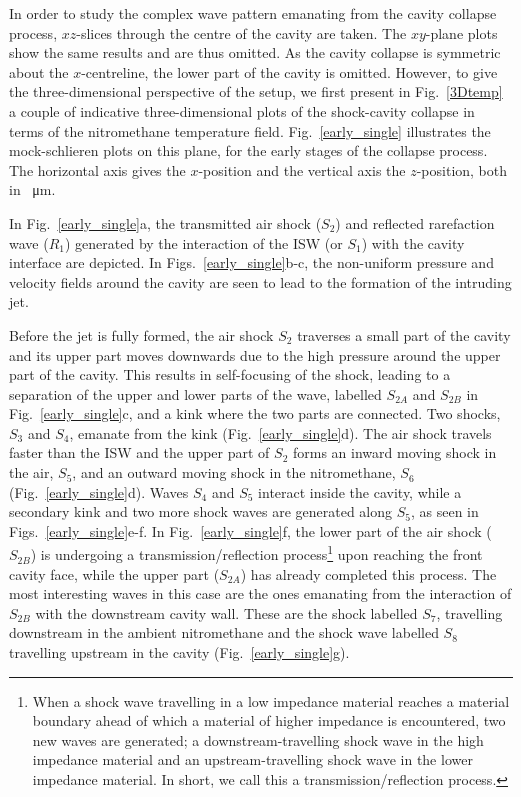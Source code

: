 \documentclass[3p,times,twocolumn]{elsarticle}
\begin{document}
In order to study the complex wave pattern emanating from the cavity collapse
process, $xz$-slices through the centre of the cavity are taken. The $xy$-plane plots show the same results and are thus omitted. As the cavity collapse is symmetric about the $x$-centreline, the lower part of the cavity is omitted. However, to give the three-dimensional perspective of the setup, we first present in Fig.\ \ref{3Dtemp} a couple of indicative three-dimensional plots of the shock-cavity collapse in terms of the nitromethane temperature field.
Fig.\  \ref{early_single} illustrates the mock-schlieren plots on this plane, for the early stages of the collapse process.
The horizontal axis gives the $x$-position  and the vertical axis the $z$-position,
both in \SI{}{\micro \meter}.
 
In Fig.\  \ref{early_single}a, the transmitted air shock ($S_2$) and reflected
rarefaction wave ($R_1$) generated by the interaction of the ISW (or $S_1$) with the
cavity interface are depicted. In Figs.\ \ref{early_single}b-c, the
non-uniform pressure and velocity fields around the cavity are seen to lead
to the formation of the intruding jet.

Before the jet is fully formed, the air shock $S_2$ traverses a small part 
of the cavity and its upper part moves downwards due to the high pressure
around the upper part of the cavity.  This results in self-focusing of the
shock, leading to a separation of the upper and lower parts of the wave,
labelled $S_{2A}$ and $S_{2B}$  in Fig.\  \ref{early_single}c, and a kink
where the two parts are connected. Two shocks,  $S_3$ and $S_4$,  emanate
from the kink (Fig.\  \ref{early_single}d). The air shock travels faster
than the ISW and the upper part of $S_2$ forms an inward moving shock in
the air, $S_5$, and an outward moving shock in the nitromethane, $S_6$ (Fig.\
 \ref{early_single}d).  Waves $S_4$ and $S_5$ interact inside the cavity,
while a secondary kink and two more shock waves are generated along $S_5$,
as seen in Figs.\  \ref{early_single}e-f. In Fig.\ \ref{early_single}f, the lower part of the air shock ($S_{2B}$) is undergoing a transmission/reflection process\footnote{When a shock wave travelling in a low impedance material reaches a material boundary ahead of which a material of higher impedance is encountered, two new waves are generated; a downstream-travelling shock wave in the high impedance material and an upstream-travelling shock wave in the lower impedance material. In short, we call this a transmission/reflection process.} upon reaching the front cavity face, while the upper part ($S_{2A}$) has already completed this process. The most interesting waves in this case are the ones emanating from the interaction of $S_{2B}$ with the downstream cavity wall. These are the shock labelled $S_7$, travelling downstream in the ambient nitromethane and the shock wave labelled $S_8$ travelling upstream in the cavity (Fig.\  \ref{early_single}g). 
\end{document}
